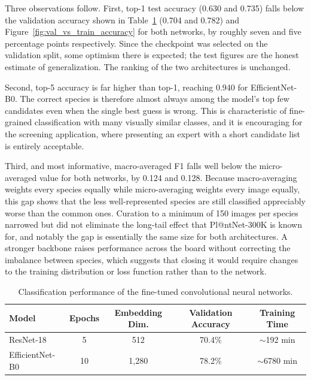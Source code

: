 \documentclass[11pt]{article}
\begin{document}
Three observations follow. First, top-1 test accuracy (0.630 and 0.735) falls below the validation accuracy shown in Table~\ref{tab:classification_results} (0.704 and 0.782) and Figure~\ref{fig:val_vs_train_accuracy} for both networks, by roughly seven and five percentage points respectively. Since the checkpoint was selected on the validation split, some optimism there is expected; the test figures are the honest estimate of generalization. The ranking of the two architectures is unchanged.

Second, top-5 accuracy is far higher than top-1, reaching 0.940 for EfficientNet-B0. The correct species is therefore almost always among the model's top few candidates even when the single best guess is wrong. This is characteristic of fine-grained classification with many visually similar classes, and it is encouraging for the screening application, where presenting an expert with a short candidate list is entirely acceptable.

Third, and most informative, macro-averaged F1 falls well below the micro-averaged value for both networks, by 0.124 and 0.128. Because macro-averaging weights every species equally while micro-averaging weights every image equally, this gap shows that the less well-represented species are still classified appreciably worse than the common ones. Curation to a minimum of 150 images per species narrowed but did not eliminate the long-tail effect that Pl@ntNet-300K is known for, and notably the gap is essentially the same size for both architectures. A stronger backbone raises performance across the board without correcting the imbalance between species, which suggests that closing it would require changes to the training distribution or loss function rather than to the network.

\begin{table}[H]
\centering
\caption{Classification performance of the fine-tuned convolutional neural networks.}
\label{tab:classification_results}
\begin{tabular}{lcccc}
\toprule
Model & Epochs & Embedding Dim. & Validation Accuracy & Training Time \\
\midrule
ResNet-18 & 5 & 512 & 70.4\% & $\sim$192 min \\
EfficientNet-B0 & 10 & 1{,}280 & 78.2\% & $\sim$6780 min \\
\bottomrule
\end{tabular}
\end{table}
\end{document}
